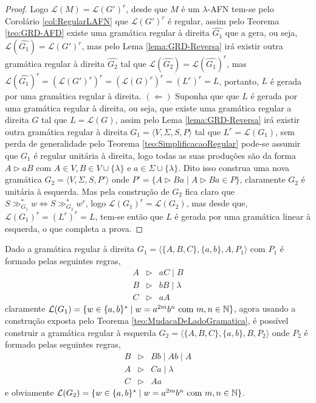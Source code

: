 \begin{proof}
	Logo $\mathcal{L}(M) = \mathcal{L}(G')^r$, desde que $M$ é um $\lambda$-AFN tem-se pelo Corolário \ref{col:RegularLAFN} que $\mathcal{L}(G')^r$ é regular, assim pelo Teorema \ref{teo:GRD-AFD} existe uma gramática regular à direita $\hat{G_1}$ que a gera, ou seja, $\mathcal{L}(\hat{G_1}) = \mathcal{L}(G')^r$, mas pelo Lema \ref{lema:GRD-Reversa} irá existir outra gramática regular à direita $\hat{G_2}$ tal que $\mathcal{L}(\hat{G_2}) = \mathcal{L}(\hat{G_1})^r$, mas $ \mathcal{L}(\hat{G_1})^r = (\mathcal{L}(G')^r)^r = (\mathcal{L}(G)^r)^r = (L^r)^r = L$, portanto, $L$ é gerada por uma gramática regular à direita. $(\Leftarrow)$ Suponha que que $L$ é gerada por uma gramática regular à direita, ou seja, que existe uma gramática regular a direita $G$ tal que $L = \mathcal{L}(G)$, assim pelo Lema \ref{lema:GRD-Reversa} irá existir outra gramática regular à direita $G_1 = \langle V, \Sigma, S, P \rangle$ tal que $L^r = \mathcal{L}(G_1)$, sem perda de generalidade pelo Teorema \ref{teo:SimplificacaoRegular} pode-se assumir que $G_1$ é regular unitária à direita, logo todas as suas produções são da forma $A \rhd aB$ com $A \in V, B \in V \cup \{\lambda\}$ e $a \in \Sigma \cup \{\lambda\}$. Dito isso construa uma nova gramática $G_2 = \langle V, \Sigma, S, P'\rangle$ onde $P' = \{A \rhd Ba \mid A \rhd Ba \in P\}$, claramente $G_2$ é unitária à esquerda. Mas pela construção de $G_2$ fica claro que $S \gg_{G_1}^* w \Longleftrightarrow S \gg_{G_2}^* w^r$, logo $\mathcal{L}(G_1)^r = \mathcal{L}(G_2)$, mas desde que, $\mathcal{L}(G_1)^r = (L^r)^r = L$, tem-se então que $L$ é gerada por uma gramática linear à esquerda, o que completa  a prova.
\end{proof}

\begin{example}
	Dado a gramática regular à direita $G_1 = \langle \{A, B, C\}, \{a, b\}, A, P_1 \rangle$ com $P_1$ é formado pelas seguintes regras,
	\begin{eqnarray*}
		A & \rhd & aC \mid B \\
		B & \rhd & bB \mid \lambda\\
		C & \rhd & aA
	\end{eqnarray*}
	claramente $\mathcal{L}(G_1) = \{w \in \{a, b\}^* \mid w = a^{2m}b^n \hbox{ com } m,n \in \mathbb{N}\}$,  agora usando a construção exposta pelo Teorema \ref{teo:MudacaDeLadoGramatica}, é possível construir a gramática regular à esquerda $G_2 = \langle \{A, B, C\}, \{a, b\}, B, P_2 \rangle$ onde $P_2$ é formado pelas seguintes regras,
	\begin{eqnarray*}
		B & \rhd & Bb \mid Ab \mid A\\
		A & \rhd & Ca \mid \lambda\\
		C & \rhd & Aa 
	\end{eqnarray*}
	e obviamente $\mathcal{L}(G_2) = \{w \in \{a, b\}^* \mid w = a^{2m}b^n \hbox{ com } m,n \in \mathbb{N}\}$.
\end{example}

